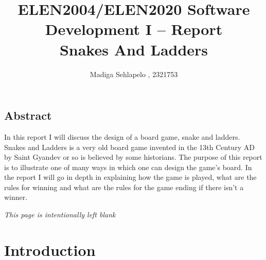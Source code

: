 

 \title{ELEN2004/ELEN2020 Software Development I -- Report \\ Snakes And Ladders}

\author{Madiga Sehlapelo , 2321753}
\maketitle 
\pagestyle{fancy}
\fancyhf{}

\fancyhead[R]{\thepage}

\newpage

\vspace*{\fill}
\begin{center}
	\begin{minipage}{.8\textwidth}
		\section*{Abstract}
		In this report I will discuss the design of a board game, snake and ladders. Snakes and Ladders is a very old board game invented in the 13th Century AD  by Saint Gyandev or so is believed by some historians. The purpose of this report is to illustrate one of many ways in which one can design the game's board. In the report I will go in depth in explaining how the game is played, what are the rules for winning and what are the rules for the game ending if there isn't a winner.
	\end{minipage}
\end{center}
\vfill %


\newpage
\tableofcontents
\newpage
 
\begin{center}
	\textit{This page is intentionally left blank}
\end{center}


\newpage
\section*{Introduction}

